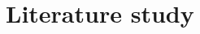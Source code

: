 \documentclass[tex/appendix.tex]{subfiles}
\begin{document}
    \label{app:literature_study}
    \chapter{Literature study}
    
\end{document}
